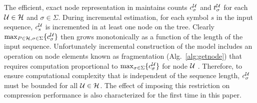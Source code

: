The efficient, exact node representation in \cite{Gasthaus2011} maintains counts $c^\U_\sigma$ and $t^\U_\sigma$ for each $\U \in \mathcal{H}$ and $\sigma \in \Sigma$.  During incremental estimation, for each symbol $s$ in the input sequence, $c^\U_s$ is incremented in at least one node on the tree.  Clearly $\max_{P \in \mathcal{H}, \sigma \in \Sigma} \{ c^\U_\sigma \}$ then grows monotonically as a function of the length of the input sequence. Unfortunately incremental construction of the model includes an operation on node elements known as fragmentation (Alg.~\ref{alg:getnode}) that requires computation proportional to $\max_{\sigma \in \Sigma} \{ c_\sigma^\U \}$ for node $\U$ \citep{Gasthaus2011}. Therefore, to ensure computational complexity that is independent of the sequence length, $c^\U_\sigma$ must be bounded for all $\U \in \mathcal{H}$.  The effect of imposing this restriction on compression performance is also characterized for the first time in this paper. 








